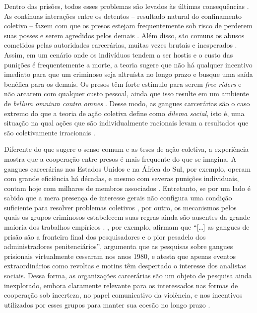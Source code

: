\documentclass[a4paper,11pt]{article}
\begin{document}
Dentro das prisões, todos esses problemas são levados às últimas consequências \citep{clemmer1940prison, sykes1960inmate}. As contínuas interações entre os detentos -- resultado natural do confinamento coletivo -- fazem com que os presos estejam frequentemente sob risco de perderem suas posses e serem agredidos pelos demais \citep{skarbek2011governance}. Além disso, são comuns os abusos cometidos pelas autoridades carcerárias, muitas vezes brutais e inesperados \citep{adorno1998prisoes, assis2008realidade, toch1977police}. Assim, em um cenário onde os indivíduos tendem a ser hostis e o custo das punições é frequentemente a morte, a teoria sugere que não há qualquer incentivo imediato para que um criminoso seja altruísta no longo prazo e busque uma saída benéfica para os demais. Os presos têm forte estímulo para serem \textit{free riders} e não arcarem com qualquer custo pessoal, ainda que isso resulte em um ambiente de \textit{bellum omnium contra omnes} \citep[16]{hobbes1983cive}. Desse modo, as gangues carcerárias são o caso extremo do que a teoria de ação coletiva define como \textit{dilema social}, isto é, uma situação na qual ações que são individualmente racionais levam a resultados que são coletivamente irracionais \citep[250]{heckathorn1996dynamics}. 

Diferente do que sugere o senso comum e as teses de ação coletiva, a experiência mostra que a cooperação entre presos é mais frequente do que se imagina. A gangues carcerárias nos Estados Unidos e na África do Sul, por exemplo, operam com grande eficiência há décadas, e mesmo com severas punições individuais, contam hoje com milhares de membros associados \citep{lotter1988prison, haysom1981towards}. Entretanto, se por um lado é sabido que a mera presença de interesse gerais não configura uma condição suficiente para resolver problemas coletivos \citep{marx2012achtzehnte,  olson1965logic}, por outro, os mecanismos pelos quais os grupos criminosos estabelecem suas regras ainda são ausentes da grande maioria dos trabalhos empíricos \citep{decker2007understanding}. \citet[2]{fleisher2001overview}, por exemplo, afirmam que ``[\dots] as gangues de prisão são a fronteira final dos pesquisadores e o pior pesadelo dos administradores penitenciários'', \citet[89]{simon2000thesociety} argumenta que as pesquisas sobre gangues prisionais virtualmente cessaram nos anos 1980, e \citet[10]{skarbek2014social} atesta que apenas eventos extraordinários como revoltas e motins têm despertado o interesse dos analistas sociais. Dessa forma, as organizações carcerárias são um objeto de pesquisa ainda inexplorado, embora claramente relevante para os interessados nas formas de cooperação sob incerteza, no papel comunicativo da violência, e nos incentivos utilizados por esses grupos para manter sua coesão no longo prazo \citep{campana2013cooperation, densley2012street, freeman1994crime}.
\end{document}

